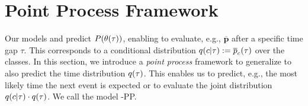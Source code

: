 
\section{Point Process Framework} 


Our models \DirModel and \GPModel predict $P(\theta(\tau))$, enabling to evaluate, e.g., $\overline{\bm{p}}$ after a specific time gap $\tau$. This corresponds to a conditional distribution $q(c|\tau):=\overline{p}_{c}(\tau)$ over the classes.
In this section, we introduce a \emph{point process} framework to generalize \DirModel to also predict the time distribution $q(\tau)$. This enables us to predict, e.g., the most likely time the next event is expected or to evaluate the joint distribution $q(c|\tau)\cdot q(\tau)$. We call the model \DirModel-PP.

